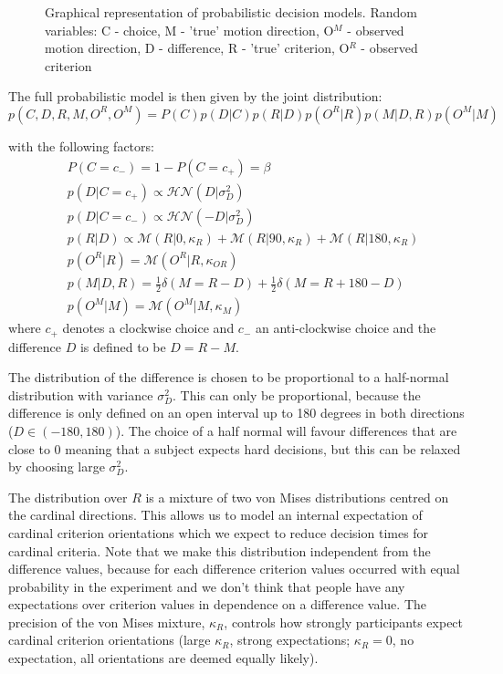 \documentclass[10pt,a4paper]{article}
\begin{document}
\begin{figure}
    \centering
    \def\svgwidth{.5\columnwidth}
    
    \caption{Graphical representation of probabilistic decision models. Random variables: C - choice, M - 'true' motion direction, O$^M$ - observed motion direction, D - difference, R - 'true' criterion, O$^R$ - observed criterion}
    \label{fig:graphic_models}
\end{figure}

The full probabilistic model is then given by the joint distribution:
\begin{equation}\label{eq:joint_diff}
p(C, D, R, M, O^R, O^M) = P(C)p(D | C)p(R | D)p(O^R | R)p(M | D, R)p(O^M | M)
\end{equation}

with the following factors:
\begin{align}
&P(C = c_-) = 1 - P(C = c_+) = \beta\\
&p(D | C=c_+) \propto \mathcal{HN}(D | \sigma_D^2)\\
&p(D | C=c_-) \propto \mathcal{HN}(-D | \sigma_D^2)\\
&p(R | D) \propto \mathcal{M}(R | 0, \kappa_{R}) + \mathcal{M}(R | 90, \kappa_{R}) + \mathcal{M}(R | 180, \kappa_{R})\\
&p(O^R | R) = \mathcal{M}(O^R | R, \kappa_{OR})\\
&p(M | D, R) = \frac{1}{2}\delta(M = R - D) + \frac{1}{2}\delta(M = R + 180 - D)\\
&p(O^M | M) = \mathcal{M}(O^M | M, \kappa_{M})
\end{align}
where $c_+$ denotes a clockwise choice and $c_-$ an anti-clockwise choice and the difference $D$ is defined to be $D = R - M$. 

The distribution of the difference is chosen to be proportional to a half-normal distribution with variance $\sigma_D^2$. This can only be proportional, because the difference is only defined on an open interval up to 180 degrees in both directions ($D \in (-180, 180)$). The choice of a half normal will favour differences that are close to 0 meaning that a subject expects hard decisions, but this can be relaxed by choosing large $\sigma_D^2$. 

The distribution over $R$ is a mixture of two von Mises distributions centred on the cardinal directions. This allows us to model an internal expectation of cardinal criterion orientations which we expect to reduce decision times for cardinal criteria. Note that we make this distribution independent from the difference values, because for each difference criterion values occurred with equal probability in the experiment and we don't think that people have any expectations over criterion values in dependence on a difference value. The precision of the von Mises mixture, $\kappa_R$, controls how strongly participants expect cardinal criterion orientations (large $\kappa_R$, strong expectations; $\kappa_R=0$, no expectation, all orientations are deemed equally likely).
\end{document}
